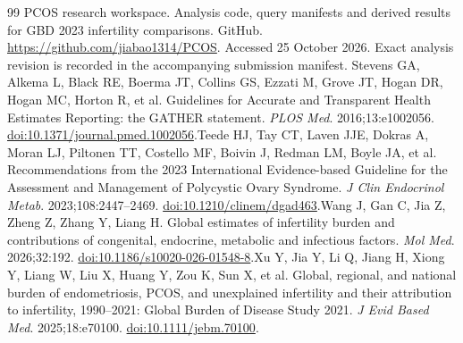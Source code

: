 \documentclass[11pt,a4paper]{article}
\begin{document}
{\begin{thebibliography}{99}
 PCOS research workspace. Analysis code, query manifests and derived results for GBD 2023 infertility comparisons. GitHub. \url{https://github.com/jiabao1314/PCOS}. Accessed 25 October 2026. Exact analysis revision is recorded in the accompanying submission manifest.
Stevens GA, Alkema L, Black RE, Boerma JT, Collins GS, Ezzati M, Grove JT, Hogan DR, Hogan MC, Horton R, et al. Guidelines for Accurate and Transparent Health Estimates Reporting: the GATHER statement. \emph{PLOS Med}. 2016;13:e1002056. \href{https://doi.org/10.1371/journal.pmed.1002056}{doi:10.1371/journal.pmed.1002056}.Teede HJ, Tay CT, Laven JJE, Dokras A, Moran LJ, Piltonen TT, Costello MF, Boivin J, Redman LM, Boyle JA, et al. Recommendations from the 2023 International Evidence-based Guideline for the Assessment and Management of Polycystic Ovary Syndrome. \emph{J Clin Endocrinol Metab}. 2023;108:2447--2469. \href{https://doi.org/10.1210/clinem/dgad463}{doi:10.1210/clinem/dgad463}.Wang J, Gan C, Jia Z, Zheng Z, Zhang Y, Liang H. Global estimates of infertility burden and contributions of congenital, endocrine, metabolic and infectious factors. \emph{Mol Med}. 2026;32:192. \href{https://doi.org/10.1186/s10020-026-01548-8}{doi:10.1186/s10020-026-01548-8}.Xu Y, Jia Y, Li Q, Jiang H, Xiong Y, Liang W, Liu X, Huang Y, Zou K, Sun X, et al. Global, regional, and national burden of endometriosis, PCOS, and unexplained infertility and their attribution to infertility, 1990--2021: Global Burden of Disease Study 2021. \emph{J Evid Based Med}. 2025;18:e70100. \href{https://doi.org/10.1111/jebm.70100}{doi:10.1111/jebm.70100}.\end{thebibliography}
}
\end{document}
